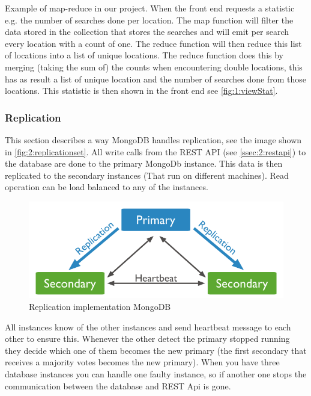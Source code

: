 Example of map-reduce in our project. When the front end requests a statistic e.g. the number of searches done per location. The map function will filter the data stored in the collection that stores the searches and will emit per search every location with a count of one. The reduce function will then reduce this list of locations into a list of unique locations. The reduce function does this by merging (taking the sum of) the counts when encountering double locations, this has as result a list of unique location and the number of searches done from those locations. This statistic is then shown in the front end see \autoref{fig:1:viewStat}.

\subsubsection{Replication}
\label{sssec:2:replication}
This section describes a way MongoDB handles replication, see the image shown in \autoref{fig:2:replicationset}. All write calls from the REST API (see \autoref{ssec:2:restapi}) to the database are done to the primary MongoDb instance. This data is then replicated to the secondary instances (That run on different machines). Read operation can be load balanced to any of the instances. 

\begin{figure}
\includegraphics[width=\textwidth]{./img/replica_set}   
\caption{Replication implementation MongoDB}
\label{fig:2:replicationset}
\end{figure}

All instances know of the other instances and send heartbeat message to each other to ensure this. Whenever the other detect the primary stopped running they decide which one of them becomes the new primary (the first secondary that receives a majority votes becomes the new primary). When you have three database instances you can handle one faulty instance, so if another one stops the communication between the database and REST Api is gone. 

